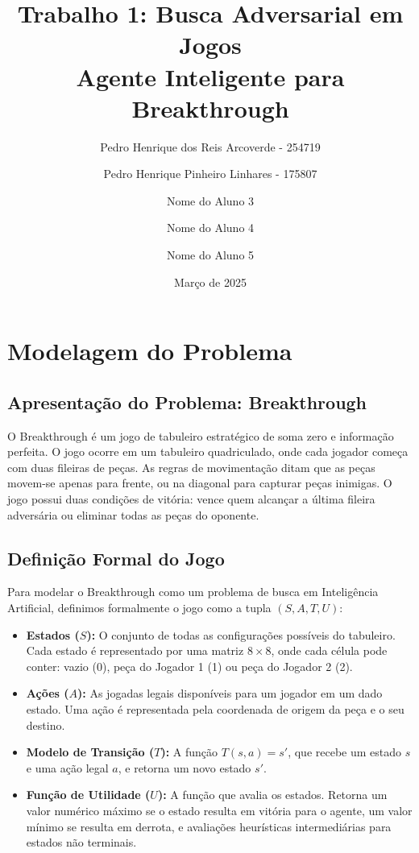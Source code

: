 \documentclass[12pt,a4paper]{article}
\title{Trabalho 1: Busca Adversarial em Jogos\\Agente Inteligente para Breakthrough}
\author{Pedro Henrique dos Reis Arcoverde - 254719 \and Pedro Henrique Pinheiro Linhares - 175807 \and Nome do Aluno 3 \and Nome do Aluno 4 \and Nome do Aluno 5}
\date{Março de 2025}
\begin{document}
\maketitle

\section{Modelagem do Problema}

\subsection{Apresentação do Problema: Breakthrough}
O Breakthrough é um jogo de tabuleiro estratégico de soma zero e informação perfeita. 
O jogo ocorre em um tabuleiro quadriculado, onde cada jogador começa com duas fileiras de peças. 
As regras de movimentação ditam que as peças movem-se apenas para frente, ou na diagonal para capturar 
peças inimigas. O jogo possui duas condições de vitória: vence quem alcançar a última fileira adversária 
ou eliminar todas as peças do oponente.

\subsection{Definição Formal do Jogo}
Para modelar o Breakthrough como um problema de busca em Inteligência Artificial, 
definimos formalmente o jogo como a tupla $(S, A, T, U)$:

\begin{itemize}
    \item \textbf{Estados ($S$):} O conjunto de todas as configurações possíveis do tabuleiro. Cada estado é representado 
    por uma matriz $8\times8$, onde cada célula pode conter: vazio (0), peça do Jogador 1 (1) ou peça do Jogador 2 (2).
    \item \textbf{Ações ($A$):} As jogadas legais disponíveis para um jogador em um dado estado.
     Uma ação é representada pela coordenada de origem da peça e o seu destino.
    \item \textbf{Modelo de Transição ($T$):} A função $T(s, a) = s'$, que recebe um estado $s$ e uma ação legal $a$, 
    e retorna um novo estado $s'$.
    \item \textbf{Função de Utilidade ($U$):} A função que avalia os estados. Retorna um valor numérico máximo 
    se o estado resulta em vitória para o agente, um valor mínimo se resulta em derrota, e avaliações heurísticas 
    intermediárias para estados não terminais.
\end{itemize}
\end{document}
